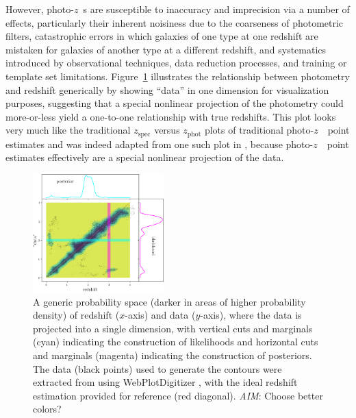 \documentclass[iop]{emulateapj}
\newcommand{\todo}[3]{{\color{#2}\emph{#1}: #3}}
\newcommand{\aim}[1]{\todo{AIM}{red}{#1}}
\newcommand{\pz}{photo-$z$~}
\begin{document}
However, \pz s are susceptible to inaccuracy and imprecision via a number of effects, particularly their inherent noisiness due to the coarseness of photometric filters, catastrophic errors in which galaxies of one type at one redshift are mistaken for galaxies of another type at a different redshift, and systematics introduced by observational techniques, data reduction processes, and training or template set limitations.  
Figure~\ref{fig:pedagogical_scatter} illustrates the relationship between photometry and redshift generically by showing ``data'' in one dimension for visualization purposes, suggesting that a special nonlinear projection of the photometry could more-or-less yield a one-to-one relationship with true redshifts.
This plot looks very much like the traditional $z_{\mathrm{spec}}$ versus $z_{\mathrm{phot}}$ plots of traditional \pz\ point estimates and was indeed adapted from one such plot in \citet{jain_whole_2015}, because \pz\ point estimates effectively are a special nonlinear projection of the data.

\begin{figure}
	\begin{center}
		\includegraphics[width=0.45\textwidth]{figures/jain05.png}
		\caption{
			A generic probability space (darker in areas of higher probability density) of redshift ($x$-axis) and data ($y$-axis), where the data is projected into a single dimension, with vertical cuts and marginals (cyan) indicating the construction of likelihoods and horizontal cuts and marginals (magenta) indicating the construction of posteriors.
			The data (black points) used to generate the contours were extracted from \citet{jain_whole_2015} using WebPlotDigitizer \citep{rohatgi_webplotdigitizer_2019}, with the ideal redshift estimation provided for reference (red diagonal).
			\aim{Choose better colors?}
		}
		\label{fig:pedagogical_scatter}
	\end{center}
\end{figure}
\end{document}
